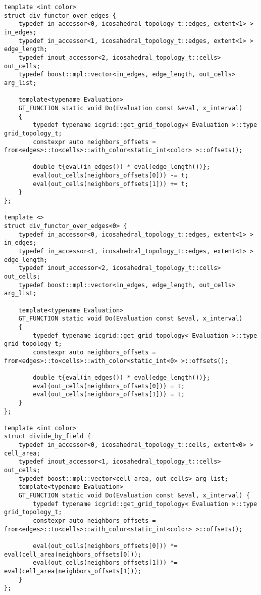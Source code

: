 \documentclass[12pt]{article}
\begin{document}
\begin{lstlisting}
template <int color>
struct div_functor_over_edges {
    typedef in_accessor<0, icosahedral_topology_t::edges, extent<1> > in_edges;
    typedef in_accessor<1, icosahedral_topology_t::edges, extent<1> > edge_length;
    typedef inout_accessor<2, icosahedral_topology_t::cells> out_cells;
    typedef boost::mpl::vector<in_edges, edge_length, out_cells> arg_list;

    template<typename Evaluation>
    GT_FUNCTION static void Do(Evaluation const &eval, x_interval)
    {
        typedef typename icgrid::get_grid_topology< Evaluation >::type grid_topology_t;
        constexpr auto neighbors_offsets = from<edges>::to<cells>::with_color<static_int<color> >::offsets();

        double t{eval(in_edges()) * eval(edge_length())};
        eval(out_cells(neighbors_offsets[0])) -= t;
        eval(out_cells(neighbors_offsets[1])) += t;
    }
};

template <>
struct div_functor_over_edges<0> {
    typedef in_accessor<0, icosahedral_topology_t::edges, extent<1> > in_edges;
    typedef in_accessor<1, icosahedral_topology_t::edges, extent<1> > edge_length;
    typedef inout_accessor<2, icosahedral_topology_t::cells> out_cells;
    typedef boost::mpl::vector<in_edges, edge_length, out_cells> arg_list;

    template<typename Evaluation>
    GT_FUNCTION static void Do(Evaluation const &eval, x_interval)
    {
        typedef typename icgrid::get_grid_topology< Evaluation >::type grid_topology_t;
        constexpr auto neighbors_offsets = from<edges>::to<cells>::with_color<static_int<0> >::offsets();

        double t{eval(in_edges()) * eval(edge_length())};
        eval(out_cells(neighbors_offsets[0])) = t;
        eval(out_cells(neighbors_offsets[1])) = t;
    }
};

template <int color>
struct divide_by_field {
    typedef in_accessor<0, icosahedral_topology_t::cells, extent<0> > cell_area;
    typedef inout_accessor<1, icosahedral_topology_t::cells> out_cells;
    typedef boost::mpl::vector<cell_area, out_cells> arg_list;
    template<typename Evaluation>
    GT_FUNCTION static void Do(Evaluation const &eval, x_interval) {
        typedef typename icgrid::get_grid_topology< Evaluation >::type grid_topology_t;
        constexpr auto neighbors_offsets = from<edges>::to<cells>::with_color<static_int<color> >::offsets();

        eval(out_cells(neighbors_offsets[0])) *= eval(cell_area(neighbors_offsets[0]));
        eval(out_cells(neighbors_offsets[1])) *= eval(cell_area(neighbors_offsets[1]));
    }
};
\end{lstlisting}
\end{document}
